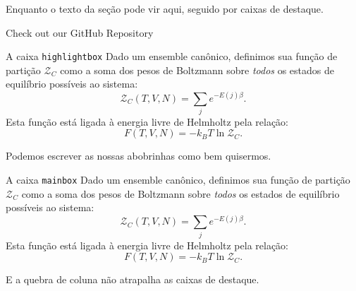 Enquanto o texto da seção pode vir aqui, seguido por caixas de destaque.

\begin{mainbox}{Check out our GitHub Repository \faGithub}
    \begin{center}
        \begin{minipage}[c]{0.2\linewidth}
            \centering
        \end{minipage}
    \end{center}
\end{mainbox}

\begin{highlightbox}{A caixa \texttt{highlightbox}}
    Dado um ensemble canônico, definimos sua função de partição $\mathcal{Z}_C$ como a soma dos pesos de Boltzmann sobre \textit{todos} os estados de equilíbrio possíveis ao sistema:
    \begin{equation}
        \mathcal{Z}_C(T,V,N) = \sum_{j}e^{-E(j)\beta}.
    \end{equation}
    Esta função está ligada à energia livre de Helmholtz pela relação:
    \begin{equation}
        F(T,V,N)=-k_BT\ln\mathcal{Z}_C.
    \end{equation}
\end{highlightbox}

Podemos escrever as nossas abobrinhas como bem quisermos.

\blablabla[2]

\begin{mainbox}{A caixa \texttt{mainbox}}
    Dado um ensemble canônico, definimos sua função de partição $\mathcal{Z}_C$ como a soma dos pesos de Boltzmann sobre \textit{todos} os estados de equilíbrio possíveis ao sistema:
    \begin{equation}
        \mathcal{Z}_C(T,V,N) = \sum_{j}e^{-E(j)\beta}.
    \end{equation}
    Esta função está ligada à energia livre de Helmholtz pela relação:
    \begin{equation}
        F(T,V,N)=-k_BT\ln\mathcal{Z}_C.
    \end{equation}
\end{mainbox}



E a quebra de coluna não atrapalha as caixas de destaque.


